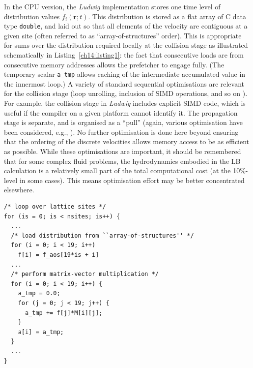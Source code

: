 In the CPU version, the \textit{Ludwig} implementation stores one time
level of distribution values $f_i(\mathbf{r}; t)$. This distribution
is stored as a flat array of C data type \texttt{double}, and laid out
so that all elements of the velocity are contiguous at a given site
(often referred to as ``array-of-structures'' order). This is
appropriate for sums over the distribution required locally at the
collision stage as illustrated schematically in
Listing~\ref{ch14:listing1}: the fact that consecutive loads are from
consecutive memory addresses allows the prefetcher to engage fully.
(The temporary scalar \texttt{a\_tmp} allows caching of the
intermediate accumulated value in the innermost loop.)  A variety of
standard sequential optimisations are relevant for the collision stage
(loop unrolling, inclusion of SIMD operations, and so on
\cite{wellein2006}).  For example, the collision stage in
\textit{Ludwig} includes explicit SIMD code, which is useful if the
compiler on a given platform cannot identify it.  The propagation
stage is separate, and is organised as a ``pull'' (again, various
optimisation have been considered, e.g.,
\cite{pohl2003,mattila2007,wittmann2012}).  No further optimisation is
done here beyond ensuring that the ordering of the discrete velocities
allows memory access to be as efficient as possible. While these
optimisations are important, it should be remembered that for some
complex fluid problems, the hydrodynamics embodied in the LB
calculation is a relatively small part of the total computational cost
(at the 10\%-level in some cases).  This means optimisation effort may
be better concentrated elsewhere.

\begin{lstlisting}[float, label=ch14:listing1,
caption = Collision schematic for CPU.]
/* loop over lattice sites */
for (is = 0; is < nsites; is++) {
  ...
  /* load distribution from ``array-of-structures'' */
  for (i = 0; i < 19; i++)    
    f[i] = f_aos[19*is + i]
  ...
  /* perform matrix-vector multiplication */  
  for (i = 0; i < 19; i++) {    
    a_tmp = 0.0;    
    for (j = 0; j < 19; j++) {      
      a_tmp += f[j]*M[i][j];   
    }
    a[i] = a_tmp;
  }
  ...
}
\end{lstlisting}


